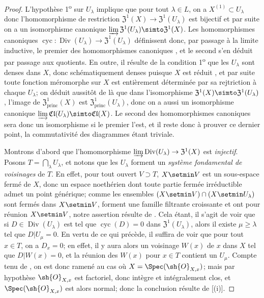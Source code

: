 \begin{proof}
L'hypothèse 1\textsuperscript{o} sur $U_\lambda$ implique que pour tout $\lambda\in L$, on a $X^{(1)}\subset U_\lambda$  donc l'homomorphisme de restriction $\mathfrak{Z}^1(X)\to\mathfrak{Z}^1(U_\lambda)$ est bijectif et par suite on a un isomorphisme canonique $\varinjlim\mathfrak{Z}^1(U_\lambda)\simto\mathfrak{Z}^1(X)$.
Les homomorphismes canoniques $\operatorname{cyc}:\operatorname{Div}(U_\lambda)\to\mathfrak{Z}^1(U_\lambda)$ définissent donc, par passage à la limite inductive, le premier des homomorphismes canoniques , et le second s'en déduit par passage aux quotients.
En outre, il résulte de la condition 1\textsuperscript{o} que les $U_\lambda$ sont denses dans $X$, donc schématiquement denses puisque $X$ est réduit , et par suite toute fonction méromorphe sur $X$ est entièrement déterminée par sa rejtriction à chaque $U_\lambda$;
on déduit aussitôt de là que dans l'isomorphisme $\mathfrak{Z}^1(X)\simto\mathfrak{Z}^1(U_\lambda)$, l'image de $\mathfrak{Z}^1_\mathrm{princ}(X)$ est $\mathfrak{Z}^1_\mathrm{princ}(U_\lambda)$, donc on a aussi un isomorphisme canonique $\varinjlim\mathfrak{Cl}(U_\lambda)\simto\mathfrak{Cl}(X)$.
Le second des homomorphismes canoniques  sera donc un isomorphisme si le premier l'est, et il reste donc à prouver ce dernier point, la commutativité des diagrammes  étant triviale.

Montrons d'abord que l'homomorphisme $\varinjlim\operatorname{Div}(U_\lambda)\to\mathfrak{Z}^1(X)$ est \emph{injectif}.
Posons $T=\bigcap_\lambda U_\lambda$, et notons que les $U_\lambda$ forment un \emph{système fondamental de voisinages} de $T$.
En effet, pour tout ouvert $V\supset T$, $X\setmin V$ est un sous-espace fermé de $X$, donc un espace noethérien dont toute partie fermée irréductible admet un point générique;
comme les ensembles $(X\setmin V)\cap(X\setmin U_\lambda)$ sont fermés dans $X\setmin V$, forment une famille filtrante croissante et ont pour réunion $X\setmin V$, notre assertion résulte de .
Cela étant, il s'agit de voir que si $D\in\operatorname{Div}(U_\lambda)$ est tel que $\operatorname{cyc}(D)=0$ dans $\mathfrak{Z}^1(U_\lambda)$, alors il existe $\mu\geq\lambda$ tel que $D|U_\mu=0$.
En vertu de ce qui précède, il suffira de voir que pour tout $x\in T$, on a $D_x=0$;
en effet, il y aura alors un voisinage $W(x)$ de $x$ dans $X$ tel que $D|W(x)=0$, et la réunion des $W(x)$ pour $x\in T$ contient un $U_\mu$.
Compte tenu de , on est donc ramené au cas où $X=\Spec(\sh{O}_{X,x})$;
mais par hypothèse $\sh{O}_{X,x}$ est factoriel, donc intègre et intégralement clos, et $\Spec(\sh{O}_{X,x})$ est alors normal;
donc la conclusion résulte de [(i)].


\end{proof}
